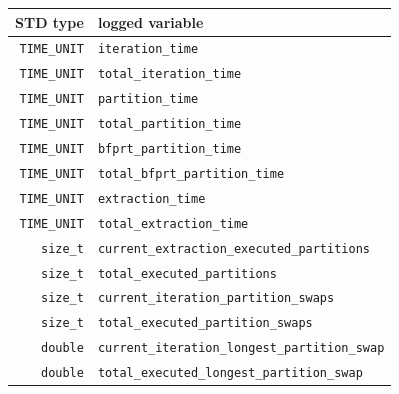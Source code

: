 \begin{figure}[!ht]
    \centering
    \begin{tabularx}{\linewidth}{|r|X|}%
    \hline
    STD type & logged variable \\ %
    \hline
    \texttt{TIME\_UNIT} & \texttt{iteration\_time} \\ %
    \hline
    \texttt{TIME\_UNIT} & \texttt{total\_iteration\_time} \\ %
    \hline
    \texttt{TIME\_UNIT} & \texttt{partition\_time} \\ %
    \hline
    \texttt{TIME\_UNIT} & \texttt{total\_partition\_time} \\ %
    \hline
    \texttt{TIME\_UNIT} & \texttt{bfprt\_partition\_time} \\ %
    \hline
    \texttt{TIME\_UNIT} & \texttt{total\_bfprt\_partition\_time} \\ %
    \hline
    \texttt{TIME\_UNIT} & \texttt{extraction\_time} \\ %
    \hline
    \texttt{TIME\_UNIT} & \texttt{total\_extraction\_time} \\ %
    \hline
    \texttt{size\_t} & \texttt{current\_extraction\_executed\_partitions} \\ %
    \hline
    \texttt{size\_t} & \texttt{total\_executed\_partitions} \\ %
    \hline
    \texttt{size\_t} & \texttt{current\_iteration\_partition\_swaps} \\ %
    \hline
    \texttt{size\_t} & \texttt{total\_executed\_partition\_swaps} \\ %
    \hline
    \texttt{double} & \texttt{current\_iteration\_longest\_partition\_swap} \\ %
    \hline
    \texttt{double} & \texttt{total\_executed\_longest\_partition\_swap} \\ %

\end{tabularx}
\end{figure}
